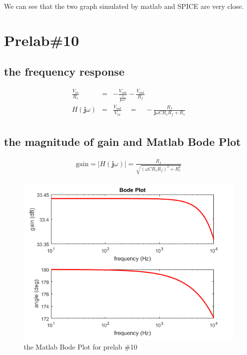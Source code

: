 \documentclass{IEEEtran}
\begin{document}
	\phantom{ } We can see that the two graph simulated by matlab and SPICE are very close. 
	\section{\textbf{Prelab\#10}}
	\subsection{the frequency response}
	\begin{eqnarray*}
		\frac{V_{in}}{R_s} & = & -\frac{V_{out}}{\frac{1}{\mathbf{j}\omega C}} - \frac{V_{out}}{R_f}\\
		H(\mathbf{j}\omega) & = & \frac{V_{out}}{V_{in}} \quad = \quad -\frac{R_f}{\mathbf{j}\omega CR_sR_f + R_s}\\
	\end{eqnarray*}
	\subsection{the magnitude of gain and Matlab Bode Plot}
	\begin{eqnarray*}
		\mathrm{gain} = |H(\mathbf{j}\omega)| = \frac{R_f}{\sqrt{(\omega C R_s R_f)^2 + R_s^2}}
	\end{eqnarray*}
	\begin{figure}[!htbp]
		\centering
		\begin{framed}
			\includegraphics[width=\linewidth]{images/10.png}
			\caption{the Matlab Bode Plot for prelab \#10}
			\label{fig:1001}
		\end{framed}
	\end{figure}
\end{document}
